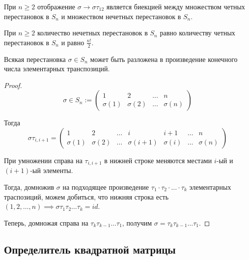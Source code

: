 \begin{corollary}
    При $n \geq 2$ отображение $\sigma \rightarrow \sigma \tau_{12}$ является биекцией между множеством четных перестановок в $S_n$ и множеством нечетных перестановок в $S_n$.
\end{corollary}

\begin{corollary}
    При $n \geq 2$ количество нечетных перестановок в $S_n$ равно количеству четных перестановок в $S_n$ и равно $\frac{n!}{2}$.
\end{corollary}

\begin{theorem}
    Всякая перестановка $\sigma \in S_n$ может быть разложена в произведение конечного числа элементарных транспозиций.
\end{theorem}

\begin{proof}
    \begin{equation*}
        \sigma \in S_n :=
        \begin{pmatrix}
            1 & 2 & \dots & n \\
            \sigma (1) & \sigma (2) & \dots & \sigma (n)
        \end{pmatrix}
    \end{equation*}

    Тогда
    \begin{equation*}
        \sigma \tau_{i, i+1} = \begin{pmatrix}
            1 & 2 & \dots & i & i+1 & \dots & n \\
            \sigma (1) & \sigma (2) & \dots & \sigma(i+1) & \sigma(i) & \dots & \sigma (n)
        \end{pmatrix}
    \end{equation*}

    При умножении справа на $\tau_{i, i+1}$ в нижней строке меняются местами $i$-ый и $(i+1)$-ый элементы.

    Тогда, домножив $\sigma$ на подходящее произведение $\tau_1 \cdot \tau_2 \cdot \dots \cdot \tau_k$ элементарных траспозиций, можем добиться, что нижняя строка есть $(1, 2, \dots, n) \implies \sigma \tau_1 \tau_2 \dots \tau_k = id$.

    Теперь, домножая справа на $\tau_k \tau_{k-1} \dots \tau_1$, получим $\sigma = \tau_k \tau_{k-1} \dots \tau_1$.
\end{proof}

\subsection{Определитель квадратной матрицы}

